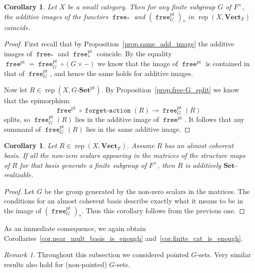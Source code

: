 \documentclass[a4paper]{amsart}
\theoremstyle{plain}
\newtheorem{corollary}[theorem]{Corollary}
\theoremstyle{definition}
\theoremstyle{remark}
\newtheorem{remark}[theorem]{Remark}
\newcommand{\funct}[1]{\operatorname{\mathtt{#1}}}
\newcommand{\Set}{\mathbf{Set}}
\newcommand{\pSet}{\mathbf{Set}^\mathrm{pt}}
\newcommand{\VectF}{\mathbf{Vect}_F}
\DeclareMathOperator{\rep}{rep}
\begin{document}
\begin{corollary} \label{cor.image_from_G_is_same}
Let \( X \) be a small category. Then for any finite subgroup \( G \) of \( F^{\times} \), the additive images of the functors \( \funct{free}_* \) and \( (\funct{free}^\mathrm{pt}_G)_* \) in \( \rep(X, \VectF) \) coincide.

\end{corollary}

\begin{proof}
First recall that by Proposition~\ref{prop.same_add_image} the additive images of \( \funct{free}_* \) and \( \funct{free}^\mathrm{pt}_* \) coincide. 
By the equality \( \funct{free}^\mathrm{pt} = \funct{free}^\mathrm{pt}_G \circ (G \times -) \) we know that the image of \( \funct{free}^\mathrm{pt} \) is contained in that of \( \funct{free}^\mathrm{pt}_G \), and hence the same holds for additive images.

Now let \( R \in \rep(X, G\text{-}\pSet) \). By Proposition~\ref{prop.free-G_split} we know that the epimorphism
\[ \funct{free}^\mathrm{pt} \circ \funct{forget-action}(R) \to \funct{free}^\mathrm{pt}_G(R) \]
splits, so \( \funct{free}^\mathrm{pt}_G(R) \) lies in the additive image of \( \funct{free}^\mathrm{pt} \). It follows that any summand of  \( \funct{free}^\mathrm{pt}_G(R) \) lies in the same additive image.
\end{proof}

\begin{corollary}
Let \( R \in \rep(X, \VectF) \). Assume \( R \) has an almost coherent basis.
If all the non-zero scalars appearing in the matrices of the structure maps of $R$ for that basis generate a finite subgroup of \( F^{\times} \), then \( R \) is additively \( \Set \)-realizable.
\end{corollary}

\begin{proof}
Let \( G \) be the group generated by the non-zero scalars in the matrices. 
The conditions for an almost coherent basis describe exactly what it means to be in the image of \( (\funct{free}^\mathrm{pt}_G)_* \). Thus this corollary follows from the previous one.
\end{proof}

As an immediate consequence, we again obtain Corollaries~\ref{cor.near_mult_basis_is_enough} and~\ref{cor.finite_cat_is_enough}.

\begin{remark}
Throughout this subsection we considered pointed \( G \)-sets. Very similar results also hold for (non-pointed) \( G \)-sets.
\end{remark}
\end{document}
